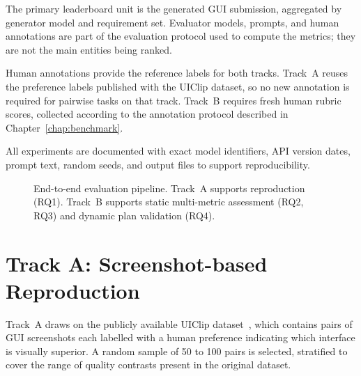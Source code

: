 The primary leaderboard unit is the generated GUI submission, aggregated
by generator model and requirement set. Evaluator models, prompts, and
human annotations are part of the evaluation protocol used to compute
the metrics; they are not the main entities being ranked.

Human annotations provide the reference labels for both tracks.
Track~A reuses the preference labels published with the UIClip dataset,
so no new annotation is required for pairwise tasks on that track.
Track~B requires fresh human rubric scores, collected according to the
annotation protocol described in Chapter~\ref{chap:benchmark}.

All experiments are documented with exact model identifiers, API version
dates, prompt text, random seeds, and output files to support
reproducibility.

\begin{figure}[t]
  \centering
  \caption{End-to-end evaluation pipeline.
           Track~A supports reproduction (RQ1).
           Track~B supports static multi-metric assessment (RQ2, RQ3)
           and dynamic plan validation (RQ4).}
  \label{fig:pipeline}
\end{figure}

\section{Track A: Screenshot-based Reproduction}
\label{sec:track-a}

Track~A draws on the publicly available UIClip dataset~\cite{uiclip},
which contains pairs of GUI screenshots each labelled with a human
preference indicating which interface is visually superior.
A random sample of 50 to 100 pairs is selected, stratified to cover
the range of quality contrasts present in the original dataset.

